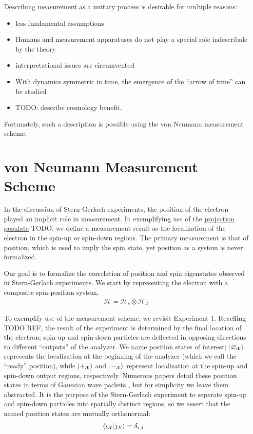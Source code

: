 Describing measurement as a unitary process is desirable for multiple reasons:
\begin{itemize}
  \item less fundamental assumptions
  \item Humans and measurement apparatuses do not play a special role indescribale by the theory
  \item interpretational issues are circumvented
  \item With dynamics symmetric in time, the emergence of the ``arrow of time'' can be studied
  \item TODO: describe cosmology benefit.
\end{itemize}

Fortunately, such a description is possible using the von Neumann measurement scheme.

\section{von Neumann Measurement Scheme}
In the discussion of Stern-Gerlach experiments, the position of the electron played an implicit role in measurement. In exemplifying use of the \hyperref[projection postulate]{projection posulate} TODO, we define a measurement result as the localization of the electron in the spin-up or spin-down regions. The primary measurement is that of position, which is used to imply the spin state, yet position as a system is never formalized.

Our goal is to formalize the correlation of position and spin eigenstates observed in Stern-Gerlach experiments. We start by representing the electron with a composite spin-position system,
\begin{align}
  \mathcal{H} = \mathcal{H}_s \otimes \mathcal{H}_\mathcal{X}
\end{align}

To exemplify use of the measurement scheme, we revisit Experiment 1. Reaclling TODO REF, the result of the experiment is determined by the final location of the electron; spin-up and spin-down particles are deflected in opposing directions to different ``outputs'' of the analyzer. We name position states of interest; $\ket{\varnothing_\mathcal{X}}$ represents the localization at the beginning of the analyzer (which we call the ``ready'' position), while $\ket{+_{\mathcal{X}}}$ and $\ket{-_{\mathcal{X}}}$ represent localization at the spin-up and spin-down output regions, respectively. Numerous papers detail these position states in terms of Gaussian wave packets \cite{Venugopalan}, but for simplicity we leave them abstracted. It is the purpose of the Stern-Gerlach experiment to seperate spin-up and spin-down particles into spatially distinct regions, so we assert that the named position states are mutually orthonormal:
\begin{align}
  \braket{i_\mathcal{X}| j_\mathcal{X}} &= \delta_{i,j}
\end{align}

